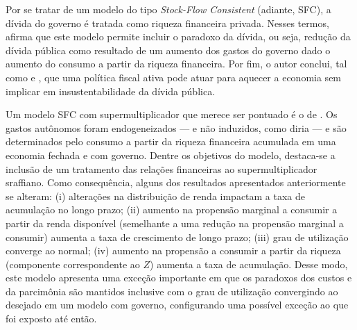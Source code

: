 Por se tratar de um modelo do tipo \textit{Stock-Flow Consistent} (adiante, SFC), a dívida do governo é tratada como riqueza financeira privada. Nesses termos, \textcite{hein_autonomous_2018} afirma que este modelo permite incluir o paradoxo da dívida, ou seja, redução da dívida pública como resultado de um aumento dos gastos do governo dado o aumento do consumo a partir da riqueza financeira. Por fim, o autor conclui, tal como \textcite[Capítulo 11]{godley_growth_2011} e \textcite{arestis_effectiveness_2012}, que uma política fiscal ativa pode atuar para aquecer a economia sem implicar em insustentabilidade da dívida pública.

Um modelo SFC com supermultiplicador que merece ser pontuado é o de \textcite{brochier_supermultiplier_2018}. Os gastos autônomos foram endogeneizados --- e não induzidos, como diria \textcite{nikiforos_comments_2018} --- e são determinados pelo consumo a partir da riqueza financeira acumulada em uma economia fechada e com governo. Dentre os objetivos do modelo, destaca-se a inclusão de um tratamento das relações financeiras ao supermultiplicador sraffiano. Como consequência, alguns dos resultados apresentados anteriormente se alteram: (i) alterações na distribuição de renda impactam a taxa de acumulação no longo prazo; (ii) aumento na propensão marginal a consumir a partir da renda disponível (semelhante a uma redução na propensão marginal a consumir) aumenta a taxa de crescimento de longo prazo; (iii) grau de utilização converge ao normal; (iv) aumento na propensão a consumir a partir da riqueza (componente correspondente ao $Z$) aumenta a taxa de acumulação. Desse modo, este modelo apresenta uma exceção importante em que os paradoxos dos custos e da parcimônia são mantidos inclusive com o grau de utilização convergindo ao desejado em um modelo com governo, configurando uma possível exceção ao que foi exposto até então.



